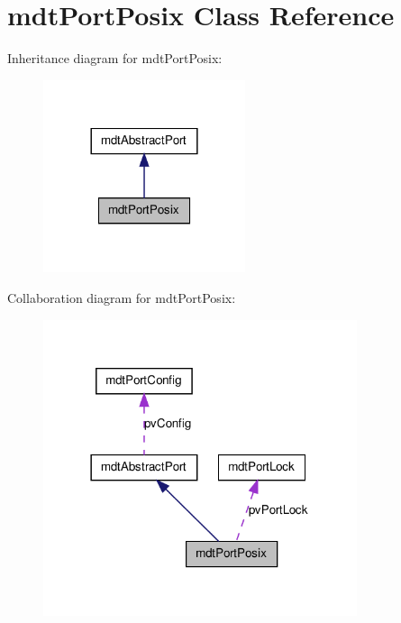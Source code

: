 \hypertarget{classmdt_port_posix}{
\section{mdtPortPosix Class Reference}
\label{classmdt_port_posix}
}


Inheritance diagram for mdtPortPosix:\nopagebreak
\begin{figure}[H]
\begin{center}
\leavevmode
\includegraphics[width=168pt]{classmdt_port_posix__inherit__graph}
\end{center}
\end{figure}


Collaboration diagram for mdtPortPosix:\nopagebreak
\begin{figure}[H]
\begin{center}
\leavevmode
\includegraphics[width=261pt]{classmdt_port_posix__coll__graph}
\end{center}
\end{figure}
